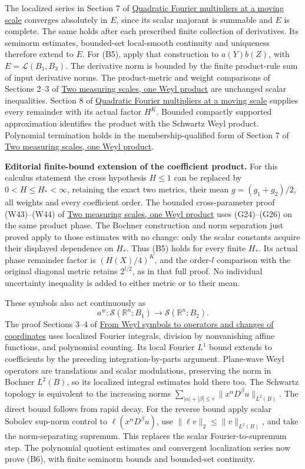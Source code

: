 \documentclass[
  11pt,
]{article}
\begin{document}
The localized series in Section 7 of
\href{gauss-transform-estimates.pdf}{Quadratic Fourier multipliers at a
moving scale} converges absolutely in \(E\), since its scalar majorant
is summable and \(E\) is complete. The same holds after each prescribed
finite collection of derivatives. Its seminorm estimates, bounded-set
local-smooth continuity and uniqueness therefore extend to \(E\). For
(B5), apply that construction to \(a(Y)b(Z)\), with
\(E=\mathcal L(B_1,B_3)\). The derivative norm is bounded by the finite
product-rule sum of input derivative norms. The product-metric and
weight comparisons of Sections 2--3 of
\href{weyl-metric-products.pdf}{Two measuring scales, one Weyl product}
are unchanged scalar inequalities. Section 8 of
\href{gauss-transform-estimates.pdf}{Quadratic Fourier multipliers at a
moving scale} supplies every remainder with its actual factor \(H^K\).
Bounded compactly supported approximation identifies the product with
the Schwartz Weyl product. Polynomial termination holds in the
membership-qualified form of Section 7 of
\href{weyl-metric-products.pdf}{Two measuring scales, one Weyl product}.

\textbf{Editorial finite-bound extension of the coefficient product.}
For this calculus statement the cross hypothesis \(H\le1\) can be
replaced by \(0<H\le H_*<\infty\), retaining the exact two metrics,
their mean \(g=(g_1+g_2)/2\), all weights and every coefficient order.
The bounded cross-parameter proof (W43)--(W44) of
\href{weyl-metric-products.pdf}{Two measuring scales, one Weyl product}
uses (G24)--(G26) on the same product phase. The Bochner construction
and norm separation just proved apply to those estimates with no change:
only the scalar constants acquire their displayed dependence on \(H_*\).
Thus (B5) holds for every finite \(H_*\). Its actual phase remainder
factor is \((H(X)/4)^K\), and the order-\(l\) comparison with the
original diagonal metric retains \(2^{l/2}\), as in that full proof. No
individual uncertainty inequality is added to either metric or to their
mean.

These symbols also act continuously as \[
 a^w:\mathcal S(\mathbb R^n;B_1)\longrightarrow
       \mathcal S(\mathbb R^n;B_2).
 \tag{B6}
\] The proof Sections 3--4 of \href{weyl-covariance-action.pdf}{From Weyl
symbols to operators and changes of coordinates} uses localized Fourier
integrals, division by nonvanishing affine functions, and polynomial
counting. Its local Fourier \(L^1\) bound extends to coefficients by the
preceding integration-by-parts argument. Plane-wave Weyl operators are
translations and scalar modulations, preserving the norm in Bochner
\(L^2(B)\), so its localized integral estimates hold there too. The
Schwartz topology is equivalent to the increasing norms
\(\sum_{|\alpha|+|\beta|\le r}\|x^\alpha D^\beta u\|_{L^2(B)}\). The
direct bound follows from rapid decay. For the reverse bound apply
scalar Sobolev sup-norm control to \(\ell(x^\alpha D^\beta u)\), use
\(\|\ell v\|_2\le\|v\|_{L^2(B)}\), and take the norm-separating
supremum. This replaces the scalar Fourier-to-supremum step. The
polynomial quotient estimates and convergent localization series now
prove (B6), with finite seminorm bounds and bounded-set continuity.
\end{document}
